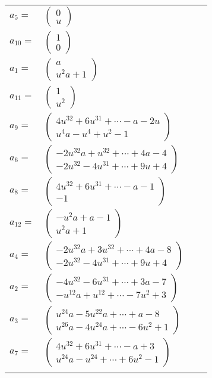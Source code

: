 \documentclass[1p]{elsarticle_modified}
\theoremstyle{definition}
\begin{document}
\begin{tabular}{m{7pt} m{180pt} m{7pt} m{180pt} }
\flushright $a_{5}=$&$\begin{pmatrix}0\\u\end{pmatrix}$ \\
\flushright $a_{10}=$&$\begin{pmatrix}1\\0\end{pmatrix}$ \\
\flushright $a_{1}=$&$\begin{pmatrix}a\\u^2 a+1\end{pmatrix}$ \\
\flushright $a_{11}=$&$\begin{pmatrix}1\\u^2\end{pmatrix}$ \\
\flushright $a_{9}=$&$\begin{pmatrix}4 u^{32}+6 u^{31}+\cdots- a-2 u\\u^4 a- u^4+u^2-1\end{pmatrix}$ \\
\flushright $a_{6}=$&$\begin{pmatrix}-2 u^{32} a+u^{32}+\cdots+4 a-4\\-2 u^{32}-4 u^{31}+\cdots+9 u+4\end{pmatrix}$ \\
\flushright $a_{8}=$&$\begin{pmatrix}4 u^{32}+6 u^{31}+\cdots- a-1\\-1\end{pmatrix}$ \\
\flushright $a_{12}=$&$\begin{pmatrix}- u^2 a+a-1\\u^2 a+1\end{pmatrix}$ \\
\flushright $a_{4}=$&$\begin{pmatrix}-2 u^{32} a+3 u^{32}+\cdots+4 a-8\\-2 u^{32}-4 u^{31}+\cdots+9 u+4\end{pmatrix}$ \\
\flushright $a_{2}=$&$\begin{pmatrix}-4 u^{32}-6 u^{31}+\cdots+3 a-7\\- u^{12} a+u^{12}+\cdots-7 u^2+3\end{pmatrix}$ \\
\flushright $a_{3}=$&$\begin{pmatrix}u^{24} a-5 u^{22} a+\cdots+a-8\\u^{26} a-4 u^{24} a+\cdots-6 u^2+1\end{pmatrix}$ \\
\flushright $a_{7}=$&$\begin{pmatrix}4 u^{32}+6 u^{31}+\cdots- a+3\\u^{24} a- u^{24}+\cdots+6 u^2-1\end{pmatrix}$\\&\end{tabular}
\end{document}
